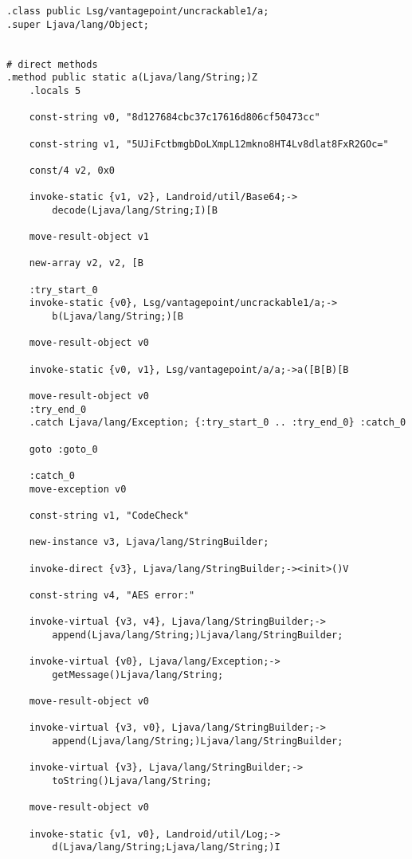 \begin{verbatim}
.class public Lsg/vantagepoint/uncrackable1/a;
.super Ljava/lang/Object;


# direct methods
.method public static a(Ljava/lang/String;)Z
    .locals 5

    const-string v0, "8d127684cbc37c17616d806cf50473cc"

    const-string v1, "5UJiFctbmgbDoLXmpL12mkno8HT4Lv8dlat8FxR2GOc="

    const/4 v2, 0x0

    invoke-static {v1, v2}, Landroid/util/Base64;->
        decode(Ljava/lang/String;I)[B

    move-result-object v1

    new-array v2, v2, [B

    :try_start_0
    invoke-static {v0}, Lsg/vantagepoint/uncrackable1/a;->
        b(Ljava/lang/String;)[B

    move-result-object v0

    invoke-static {v0, v1}, Lsg/vantagepoint/a/a;->a([B[B)[B

    move-result-object v0
    :try_end_0
    .catch Ljava/lang/Exception; {:try_start_0 .. :try_end_0} :catch_0

    goto :goto_0

    :catch_0
    move-exception v0

    const-string v1, "CodeCheck"

    new-instance v3, Ljava/lang/StringBuilder;

    invoke-direct {v3}, Ljava/lang/StringBuilder;-><init>()V

    const-string v4, "AES error:"

    invoke-virtual {v3, v4}, Ljava/lang/StringBuilder;->
        append(Ljava/lang/String;)Ljava/lang/StringBuilder;

    invoke-virtual {v0}, Ljava/lang/Exception;->
        getMessage()Ljava/lang/String;

    move-result-object v0

    invoke-virtual {v3, v0}, Ljava/lang/StringBuilder;->
        append(Ljava/lang/String;)Ljava/lang/StringBuilder;

    invoke-virtual {v3}, Ljava/lang/StringBuilder;->
        toString()Ljava/lang/String;

    move-result-object v0

    invoke-static {v1, v0}, Landroid/util/Log;->
        d(Ljava/lang/String;Ljava/lang/String;)I


\end{verbatim}
